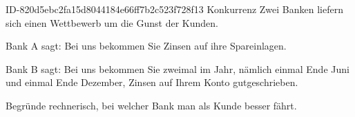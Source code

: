 \begin{exercise}
      {ID-820d5ebc2fa15d8044184e66ff7b2c523f728f13}
      {Konkurrenz}
  \ifproblem\problem
    Zwei Banken liefern sich einen Wettbewerb um die Gunst der
    Kunden.\par
    Bank A sagt: \glqq Bei uns bekommen Sie  Zinsen auf ihre
    Spareinlagen.\grqq\par
    Bank B sagt: \glqq Bei uns bekommen Sie zweimal im Jahr, nämlich einmal
    Ende Juni und einmal Ende Dezember,  Zinsen auf Ihrem Konto
    gutgeschrieben.\grqq\par
    Begründe rechnerisch, bei welcher Bank man als Kunde besser fährt.
  \fi
\end{exercise}
